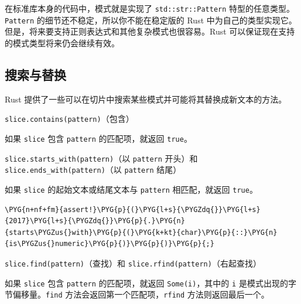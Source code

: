 在标准库本身的代码中，模式就是实现了 \texttt{std::str::Pattern} 特型的任意类型。\texttt{Pattern} 的细节还不稳定，所以你不能在稳定版的 Rust 中为自己的类型实现它。但是，将来要支持正则表达式和其他复杂模式也很容易。Rust 可以保证现在支持的模式类型将来仍会继续有效。

\subsection{搜索与替换}

Rust 提供了一些可以在切片中搜索某些模式并可能将其替换成新文本的方法。

\begin{mySidenote}
\texttt{slice.contains(pattern)}（包含）
\end{mySidenote}

如果 \texttt{slice} 包含 \texttt{pattern} 的匹配项，就返回 \texttt{true}。

\begin{myNote}
\texttt{slice.starts\_with(pattern)}（以 \texttt{pattern} 开头）和 \texttt{slice.ends\_with(pattern)}（以 \texttt{pattern} 结尾）
\end{myNote}

如果 \texttt{slice} 的起始文本或结尾文本与 \texttt{pattern} 相匹配，就返回 \texttt{true}。

\begin{Verbatim}[commandchars=\\\{\},breaklines=true,breakanywhere=true,fontsize=\codefont,xleftmargin=17bp]
\PYG{n+nf+fm}{assert!}\PYG{p}{(}\PYG{l+s}{\PYGZdq{}}\PYG{l+s}{2017}\PYG{l+s}{\PYGZdq{}}\PYG{p}{.}\PYG{n}{starts\PYGZus{}with}\PYG{p}{(}\PYG{k+kt}{char}\PYG{p}{::}\PYG{n}{is\PYGZus{}numeric}\PYG{p}{)}\PYG{p}{)}\PYG{p}{;}
\end{Verbatim}

\begin{myNote}
\texttt{slice.find(pattern)}（查找）和 \texttt{slice.rfind(pattern)}（右起查找）
\end{myNote}

如果 \texttt{slice} 包含 \texttt{pattern} 的匹配项，就返回 \texttt{Some(i)}，其中的 \texttt{i} 是模式出现的字节偏移量。\texttt{find} 方法会返回第一个匹配项，\texttt{rfind} 方法则返回最后一个。

